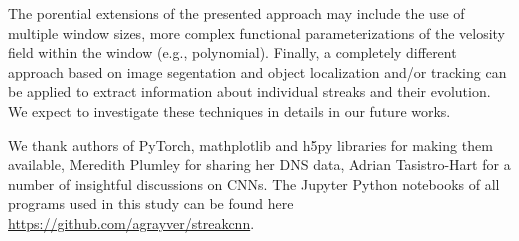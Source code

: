 \documentclass{svjour3}                     %
\begin{document}
The porential extensions of the presented approach may include the use of multiple window sizes, more complex functional parameterizations of the velosity field within the window (e.g., polynomial). Finally, a completely different approach based on image segentation and object localization and/or tracking can be applied to extract information about individual streaks and their evolution. We expect to investigate these techniques in details in our future works.

\begin{acknowledgements}
We thank authors of PyTorch, mathplotlib and h5py libraries for making them available, Meredith Plumley for sharing her DNS data, Adrian Tasistro-Hart for a number of insightful discussions on CNNs. The Jupyter Python notebooks of all programs used in this study can be found here \url{https://github.com/agrayver/streakcnn}.
\end{acknowledgements}





\end{document}
